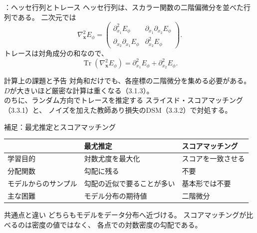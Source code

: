 \begin{frame}{\supplmark：ヘッセ行列とトレース}
    ヘッセ行列は、スカラー関数の二階偏微分を並べた行列である。
    二次元では
    \[
        \nabla_{\bm{x}}^{2}E_\phi
        =
        \begin{pmatrix}
            \partial_{x_1}^{2}E_\phi & \partial_{x_1}\partial_{x_2}E_\phi\\
            \partial_{x_2}\partial_{x_1}E_\phi & \partial_{x_2}^{2}E_\phi
        \end{pmatrix}.
\]
    トレースは対角成分の和なので、
    \[
        \operatorname{Tr}(\nabla_{\bm{x}}^{2}E_\phi)
        =
        \partial_{x_1}^{2}E_\phi
        +
        \partial_{x_2}^{2}E_\phi.
\]
    \begin{exampleblock}{計算上の課題と予告}
        対角和だけでも、各座標の二階微分を集める必要がある。
        $D$が大きいほど厳密な計算は重くなる（3.1.3）。\\
        のちに、ランダム方向でトレースを推定する
        スライスド・スコアマッチング（3.3.1）と、
        ノイズを加えた教師あり損失のDSM（3.3.2）で対処する。
    \end{exampleblock}
\end{frame}
\assuppl
\begin{frame}{補足：最尤推定とスコアマッチング}
    \centering
    \footnotesize
    \renewcommand{\arraystretch}{1.25}
    \begin{tabular}{|p{}|p{}|p{}|}
        \hline
        & 最尤推定 & スコアマッチング \\
        \hline
        学習目的 & 対数尤度を最大化 & スコアを一致させる \\
        \hline
        分配関数 & 勾配に残る & 不要 \\
        \hline
        モデルからのサンプル & 勾配の近似で要ることが多い & 基本形では不要 \\
        \hline
        主な困難 & モデル分布の期待値 & 二階微分 \\
        \hline
    \end{tabular}
    \vfill
    \normalsize
    \begin{exampleblock}{共通点と違い}
        どちらもモデルをデータ分布へ近づける。
        スコアマッチングが比べるのは密度の値ではなく、
        各点での対数密度の勾配である。
    \end{exampleblock}
\end{frame}
